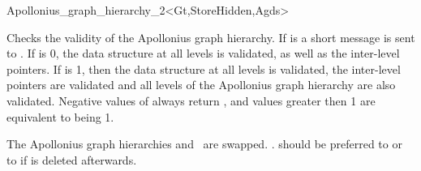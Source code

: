 \begin{ccRefClass}{Apollonius_graph_hierarchy_2<Gt,StoreHidden,Agds>}
\begin{ccAdvanced}
{Checks the validity of the Apollonius graph hierarchy. If
 is  a short message is sent to
. If  is 0, the data structure at all levels 
is validated, as well as the inter-level pointers. If  is
1, then the data structure at all levels is validated, the inter-level
pointers are validated and all levels of the Apollonius graph
hierarchy are also validated. Negative values of  always
return , and values greater then 1 are equivalent to
 being 1.}
\end{ccAdvanced}

%
\ccGlue
{The Apollonius graph hierarchies  and \ccVar\ are
swapped. \ccVar. should be preferred to \ccVar{} or to \ccVar{} if  is deleted afterwards.}


\ccSeeAlso
{}\\
\\
\\
\\
\\
\\
\\



\end{ccRefClass}

